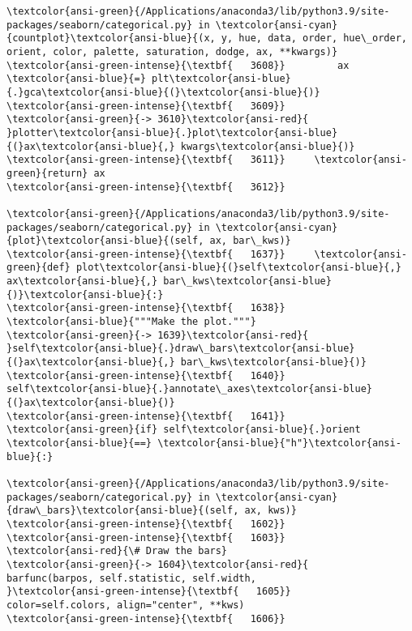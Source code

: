 \documentclass[11pt]{article}
\begin{document}
\begin{Verbatim}[commandchars=\\\{\}, frame=single, framerule=2mm, rulecolor=\color{outerrorbackground}]
\textcolor{ansi-green}{/Applications/anaconda3/lib/python3.9/site-packages/seaborn/categorical.py} in \textcolor{ansi-cyan}{countplot}\textcolor{ansi-blue}{(x, y, hue, data, order, hue\_order, orient, color, palette, saturation, dodge, ax, **kwargs)}
\textcolor{ansi-green-intense}{\textbf{   3608}}         ax \textcolor{ansi-blue}{=} plt\textcolor{ansi-blue}{.}gca\textcolor{ansi-blue}{(}\textcolor{ansi-blue}{)}
\textcolor{ansi-green-intense}{\textbf{   3609}} 
\textcolor{ansi-green}{-> 3610}\textcolor{ansi-red}{     }plotter\textcolor{ansi-blue}{.}plot\textcolor{ansi-blue}{(}ax\textcolor{ansi-blue}{,} kwargs\textcolor{ansi-blue}{)}
\textcolor{ansi-green-intense}{\textbf{   3611}}     \textcolor{ansi-green}{return} ax
\textcolor{ansi-green-intense}{\textbf{   3612}} 

\textcolor{ansi-green}{/Applications/anaconda3/lib/python3.9/site-packages/seaborn/categorical.py} in \textcolor{ansi-cyan}{plot}\textcolor{ansi-blue}{(self, ax, bar\_kws)}
\textcolor{ansi-green-intense}{\textbf{   1637}}     \textcolor{ansi-green}{def} plot\textcolor{ansi-blue}{(}self\textcolor{ansi-blue}{,} ax\textcolor{ansi-blue}{,} bar\_kws\textcolor{ansi-blue}{)}\textcolor{ansi-blue}{:}
\textcolor{ansi-green-intense}{\textbf{   1638}}         \textcolor{ansi-blue}{"""Make the plot."""}
\textcolor{ansi-green}{-> 1639}\textcolor{ansi-red}{         }self\textcolor{ansi-blue}{.}draw\_bars\textcolor{ansi-blue}{(}ax\textcolor{ansi-blue}{,} bar\_kws\textcolor{ansi-blue}{)}
\textcolor{ansi-green-intense}{\textbf{   1640}}         self\textcolor{ansi-blue}{.}annotate\_axes\textcolor{ansi-blue}{(}ax\textcolor{ansi-blue}{)}
\textcolor{ansi-green-intense}{\textbf{   1641}}         \textcolor{ansi-green}{if} self\textcolor{ansi-blue}{.}orient \textcolor{ansi-blue}{==} \textcolor{ansi-blue}{"h"}\textcolor{ansi-blue}{:}

\textcolor{ansi-green}{/Applications/anaconda3/lib/python3.9/site-packages/seaborn/categorical.py} in \textcolor{ansi-cyan}{draw\_bars}\textcolor{ansi-blue}{(self, ax, kws)}
\textcolor{ansi-green-intense}{\textbf{   1602}} 
\textcolor{ansi-green-intense}{\textbf{   1603}}             \textcolor{ansi-red}{\# Draw the bars}
\textcolor{ansi-green}{-> 1604}\textcolor{ansi-red}{             barfunc(barpos, self.statistic, self.width,
}\textcolor{ansi-green-intense}{\textbf{   1605}}                     color=self.colors, align="center", **kws)
\textcolor{ansi-green-intense}{\textbf{   1606}} 


\end{Verbatim}
\end{document}
